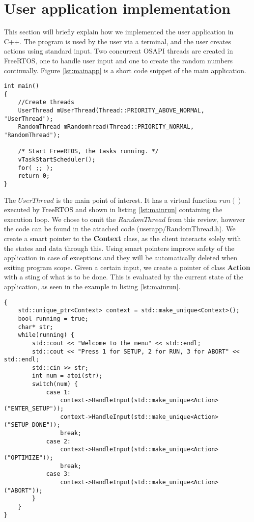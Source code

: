 \section{User application implementation}\label{sec:userapp}

This section will briefly explain how we implemented the user application in C++. The program is used by the user via a terminal, and the user creates actions using standard input. Two concurrent OSAPI threads are created in FreeRTOS, one to handle user input and one to create the random numbers continually. Figure \ref{lst:mainapp} is a short code snippet of the main application. \\

\begin{lstlisting}[style=customc++,caption={Main application, where two threads are created and the scheduler started.},label={lst:mainapp}]
int main()
{
	//Create threads
	UserThread mUserThread(Thread::PRIORITY_ABOVE_NORMAL, "UserThread");
	RandomThread mRandomhread(Thread::PRIORITY_NORMAL, "RandomThread");

	/* Start FreeRTOS, the tasks running. */
	vTaskStartScheduler();
	for( ;; );
	return 0;
}
\end{lstlisting}

The $UserThread$ is the main point of interest. It has a virtual function $run()$ executed by FreeRTOS and shown in listing \ref{lst:mainrun} containing the execution loop. We chose to omit the $RandomThread$ from this review, however the code can be found in the attached code (userapp/RandomThread.h). We create a smart pointer to the \textbf{Context} class, as the client interacts solely with the states and data through this. Using smart pointers improve safety of the application in case of exceptions and they will be automatically deleted when exiting program scope. Given a certain input, we create a pointer of class \textbf{Action} with a sting of what is to be done. This is evaluated by the current state of the application, as seen in the example in listing \ref{lst:mainrun}. \\

\begin{lstlisting}[style=customc++,caption={Main application, where two threads are created with a scheduler.},label={lst:mainrun}]
{
	std::unique_ptr<Context> context = std::make_unique<Context>();
	bool running = true;
	char* str;
	while(running) {
		std::cout << "Welcome to the menu" << std::endl;
		std::cout << "Press 1 for SETUP, 2 for RUN, 3 for ABORT" << std::endl;
		std::cin >> str;
		int num = atoi(str);
		switch(num) {
			case 1:
				context->HandleInput(std::make_unique<Action>("ENTER_SETUP"));
				context->HandleInput(std::make_unique<Action>("SETUP_DONE"));
				break;
			case 2:
				context->HandleInput(std::make_unique<Action>("OPTIMIZE"));
				break;
			case 3:
				context->HandleInput(std::make_unique<Action>("ABORT"));
		}
	}
}
\end{lstlisting}

